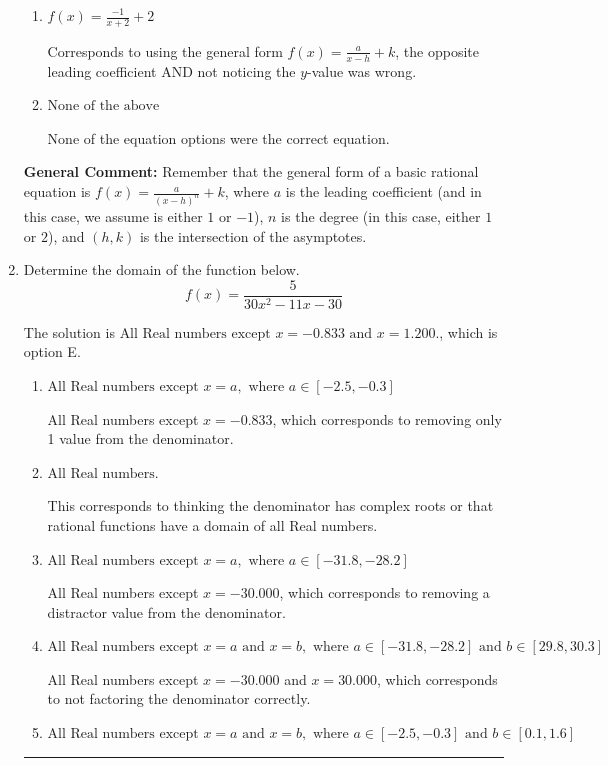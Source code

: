 \documentclass{extbook}[14pt]
\newcommand{\litem}[1]{\item #1

\rule{\textwidth}{0.4pt}}
\begin{document}
\begin{enumerate}
{\begin{enumerate}[label=\Alph*.]
Corresponds to thinking the graph was a shifted version of $\frac{1}{x^2}$, using the general form $f(x) = \frac{a}{x-h}+k$, the opposite leading coefficient, AND not noticing the $y$-value was wrong.
\item \( f(x) = \frac{-1}{x + 2} + 2 \)

Corresponds to using the general form $f(x) = \frac{a}{x-h}+k$, the opposite leading coefficient AND not noticing the $y$-value was wrong.
\item \( \text{None of the above} \)

None of the equation options were the correct equation.
\end{enumerate}

\textbf{General Comment:} Remember that the general form of a basic rational equation is $ f(x) = \frac{a}{(x-h)^n} + k$, where $a$ is the leading coefficient (and in this case, we assume is either $1$ or $-1$), $n$ is the degree (in this case, either $1$ or $2$), and $(h, k)$ is the intersection of the asymptotes.
}
\litem{
Determine the domain of the function below.
\[ f(x) = \frac{5}{30x^{2} -11 x -30} \]

The solution is \( \text{All Real numbers except } x = -0.833 \text{ and } x = 1.200. \), which is option E.\begin{enumerate}[label=\Alph*.]
\item \( \text{All Real numbers except } x = a, \text{ where } a \in [-2.5, -0.3] \)

All Real numbers except $x = -0.833$, which corresponds to removing only 1 value from the denominator.
\item \( \text{All Real numbers.} \)

This corresponds to thinking the denominator has complex roots or that rational functions have a domain of all Real numbers.
\item \( \text{All Real numbers except } x = a, \text{ where } a \in [-31.8, -28.2] \)

All Real numbers except $x = -30.000$, which corresponds to removing a distractor value from the denominator.
\item \( \text{All Real numbers except } x = a \text{ and } x = b, \text{ where } a \in [-31.8, -28.2] \text{ and } b \in [29.8, 30.3] \)

All Real numbers except $x = -30.000$ and $x = 30.000$, which corresponds to not factoring the denominator correctly.
\item \( \text{All Real numbers except } x = a \text{ and } x = b, \text{ where } a \in [-2.5, -0.3] \text{ and } b \in [0.1, 1.6] \)


\end{enumerate}}
\end{enumerate}
\end{document}
